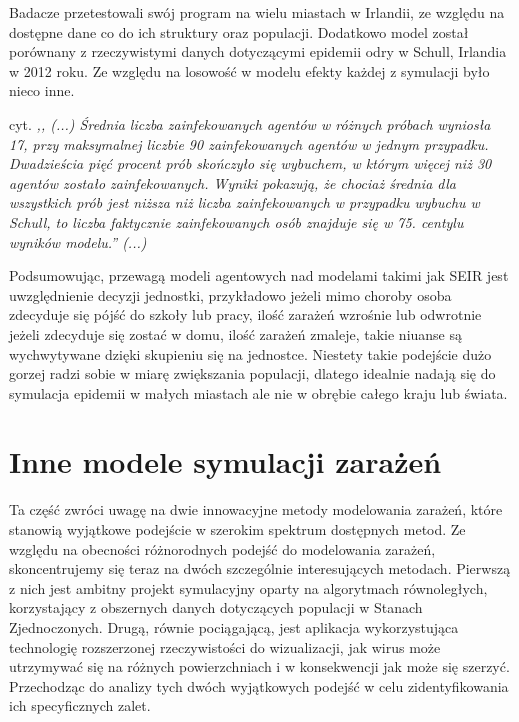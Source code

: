 Badacze przetestowali swój program na wielu miastach w Irlandii, ze względu na dostępne dane co do ich struktury oraz populacji.
Dodatkowo model został porównany z rzeczywistymi danych dotyczącymi epidemii odry w Schull, Irlandia w 2012 roku. Ze względu na losowość w modelu efekty każdej z symulacji było nieco inne. 

cyt. \textit{,, (...) Średnia liczba zainfekowanych agentów w różnych próbach wyniosła 17, przy maksymalnej liczbie 90 zainfekowanych agentów w jednym przypadku. Dwadzieścia pięć procent prób skończyło się wybuchem, w którym więcej niż 30 agentów zostało zainfekowanych. Wyniki pokazują, że chociaż średnia dla wszystkich prób jest niższa niż liczba zainfekowanych w przypadku wybuchu w Schull, to liczba faktycznie zainfekowanych osób znajduje się w 75. centylu wyników modelu.'' (...)}\cite{bib:artykul1}

Podsumowując, przewagą modeli agentowych nad modelami takimi jak SEIR jest uwzględnienie decyzji jednostki, przykładowo jeżeli mimo choroby osoba zdecyduje się pójść do szkoły lub pracy, ilość zarażeń wzrośnie lub odwrotnie jeżeli zdecyduje się zostać w domu, ilość zarażeń zmaleje, takie niuanse są wychwytywane dzięki skupieniu się na jednostce. Niestety takie podejście dużo gorzej radzi sobie w miarę zwiększania populacji, dlatego idealnie nadają się do symulacja epidemii w małych miastach ale nie w obrębie całego kraju lub świata.

\section{\textbf{Inne modele symulacji zarażeń}}

Ta część zwróci uwagę na dwie innowacyjne metody modelowania zarażeń, które stanowią wyjątkowe podejście w szerokim spektrum dostępnych metod. Ze względu na obecności różnorodnych podejść do modelowania zarażeń, skoncentrujemy się teraz na dwóch szczególnie interesujących metodach. Pierwszą z nich jest ambitny projekt symulacyjny oparty na algorytmach równoległych, korzystający z obszernych danych dotyczących populacji w Stanach Zjednoczonych. Drugą, równie pociągającą, jest aplikacja wykorzystująca technologię rozszerzonej rzeczywistości do wizualizacji, jak wirus może utrzymywać się na różnych powierzchniach i w konsekwencji jak może się szerzyć. Przechodząc do analizy tych dwóch wyjątkowych podejść w celu zidentyfikowania ich specyficznych zalet.

